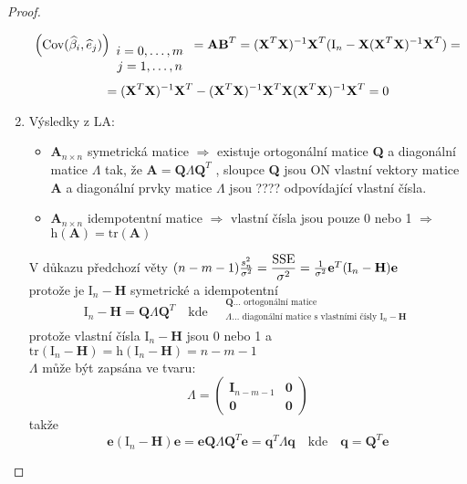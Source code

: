 \begin{proof}
\begin{enumerate}
$$
 \left( \text{Cov}(  \widehat{\beta}_i , \widehat{e}_j ) \right)_{ \begin{array}{c}
 i = 0, \dots , m \\
 j = 1, \dots , n
 \end{array} } = \textbf{AB}^{T}
 = ( \textbf{X}^{T} \textbf{X} )^{-1} \textbf{X}^{T} ( \text{I}_n - \textbf{X} ( \textbf{X}^{T} \textbf{X} )^{-1} \textbf{X}^{T} ) = 
 $$
 $$
 = ( \textbf{X}^{T} \textbf{X} )^{-1} \textbf{X}^{T} - ( \textbf{X}^{T} \textbf{X} )^{-1} \textbf{X}^{T} \textbf{X} ( \textbf{X}^{T} \textbf{X} )^{-1} \textbf{X}^{T} = 0
$$
\item Výsledky z LA: \\
\begin{itemize}
\item $ \textbf{A}_{n \times n} $ symetrická matice $ \Rightarrow $ existuje ortogonální matice \textbf{Q} a diagonální matice $ \Lambda $ tak, že $ \textbf{A} = \textbf{Q} \Lambda \textbf{Q}^{T} $ , sloupce \textbf{Q} jsou ON vlastní vektory matice \textbf{A} a diagonální prvky matice $ \Lambda $ jsou ???? odpovídající vlastní čísla.
\item $ \textbf{A}_{n \times n} $ idempotentní matice $ \Rightarrow $ vlastní čísla jsou pouze 0 nebo 1 $ \Rightarrow $ $ \text{h}( \textbf{A} ) = \text{tr}( \textbf{A} ) $ 
\end{itemize}
V důkazu předchozí věty $ (n - m -1) \frac{s_n^{2}}{\sigma^{2}} = \dfrac{\mathrm{SSE}}{\sigma^{2}} = \frac{1}{\sigma^{2}} \textbf{e}^{T} ( \text{I}_n - \textbf{H} ) \textbf{e} $ \\
protože je $ \text{I}_n - \textbf{H} $ symetrické a idempotentní 
$$
 \text{I}_n - \textbf{H} = \textbf{Q} \Lambda \textbf{Q}^{T}  \quad \text{kde} \quad
 \begin{array}{c}
 _{\textbf{Q} \dots \text{ ortogonální matice}} \\
 ^{\Lambda \dots \text{ diagonální matice s vlastními čísly } \text{I}_n - \textbf{H}}
 \end{array}
$$
protože vlastní čísla $ \text{I}_n - \textbf{H} $ jsou 0 nebo 1 a $ \text{tr}(\text{I}_n - \textbf{H}) = \text{h}(\text{I}_n - \textbf{H}) = n - m - 1 $ \\
$ \Lambda $ může být zapsána ve tvaru:
$$
 \Lambda = 
 \left( \begin{array}{cc}
 \textbf{I}_{n-m-1} & \textbf{0}  \\
 \textbf{0} & \textbf{0} 
 \end{array} \right)
$$
takže
$$
 \textbf{e} ( \text{I}_n - \textbf{H} ) \textbf{e} = \textbf{e} \textbf{Q} \Lambda \textbf{Q}^{T} \textbf{e} = \textbf{q}^{T} \Lambda \textbf{q} \quad \text{kde} \quad \textbf{q} = \textbf{Q}^{T} \textbf{e}
$$
\end{enumerate}
\end{proof}

